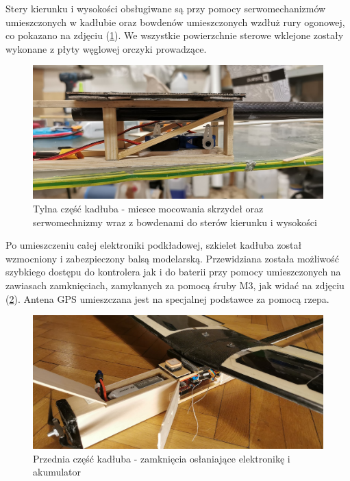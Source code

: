 \documentclass[12pt, a4paper]{article}
\let\oldref\ref
\renewcommand{\ref}[1]{(\oldref{#1})}
\begin{document}
Stery kierunku i wysokości obsługiwane są przy pomocy serwomechanizmów umieszczonych w kadłubie oraz bowdenów umieszczonych wzdłuż rury ogonowej, co pokazano na zdjęciu \ref{fig:tyl}. We wszystkie powierzchnie sterowe wklejone zostały wykonane z płyty węglowej orczyki prowadzące. 

\begin{figure}[ht]
    \centering
    \includegraphics[width=1\textwidth]{tyl}
    \caption{Tylna część kadłuba - miesce mocowania skrzydeł oraz serwomechnizmy wraz z bowdenami do sterów kierunku i wysokości}
    \label{fig:tyl}
\end{figure}

Po umieszczeniu całej elektroniki podkładowej, szkielet kadłuba został wzmocniony i zabezpieczony balsą modelarską. Przewidziana została możliwość szybkiego dostępu do kontrolera jak i do baterii przy pomocy umieszczonych na zawiasach zamknięciach, zamykanych za pomocą śruby M3, jak widać na zdjęciu \ref{fig:przod}. Antena GPS umieszczana jest na specjalnej podstawce za pomocą rzepa.

\begin{figure}[ht]
    \centering
    \includegraphics[width=1\textwidth]{przod}
    \caption{Przednia część kadłuba - zamknięcia osłaniające elektronikę i akumulator}
    \label{fig:przod}
\end{figure}
\end{document}
